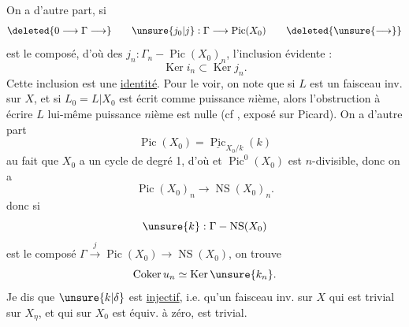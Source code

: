 On a d'autre part, si
\[
\deleted{0\longrightarrow\Gamma\longrightarrow}\qquad \unsure{j_0|j}:\Gamma\longrightarrow\operatorname{Pic}(X_0)\qquad\deleted{\unsure{\longrightarrow}}
\]
est le composé, d'où des $j_n:\Gamma_n\mathbin{-}\operatorname{Pic}(X_0)_n$,  l'inclusion évidente :
\[
\operatorname{Ker}i_n\subset\operatorname{Ker}j_n.
\]
Cette inclusion est  une \uline{identité}. Pour le voir, on note que si $L$ est un faisceau inv. sur $X$, et si $L_0=L|X_0$ est écrit comme puissance $n$ième, alors l'obstruction à écrire $L$ lui-même puissance $n$ième est nulle (cf , exposé sur Picard). On a d'autre part
\[
\operatorname{Pic}(X_0)=\underline{\operatorname{Pic}}_{X_0/k}(k)
\]
 au fait que $X_0$ a un cycle de degré 1, d'où
et $\operatorname{Pic}^{0}(X_0)$ est $n$-divisible, donc on a
\[
\operatorname{Pic}(X_0)_n\longrightarrow\operatorname{NS}(X_0)_n.
\]
donc si
\[
\unsure{k}:\Gamma\mathbin{-}\operatorname{NS}(X_0)
\]
est le composé $\Gamma\xrightarrow{j}\operatorname{Pic}(X_0)\longrightarrow\operatorname{NS}(X_0)$, on trouve
\[
\operatorname{Coker}u_n\simeq\operatorname{Ker}\unsure{k_n}.
\]
Je dis que  $\unsure{k|\delta}$ est \uline{injectif}, i.e. qu'un faisceau inv. sur $X$ qui est trivial sur $X_\eta$, et qui sur $X_0$ est  équiv. à zéro,  est trivial.

